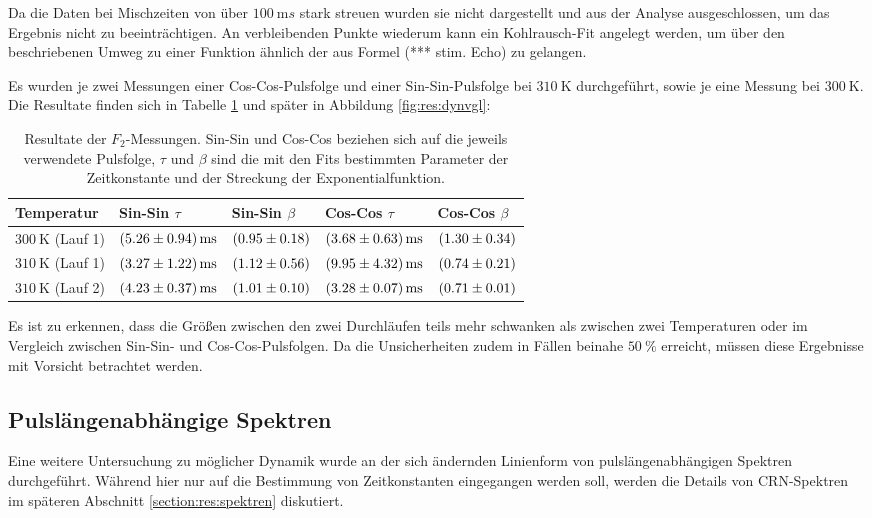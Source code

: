Da die Daten bei Mischzeiten von über $\SI{100}{\milli s}$ stark streuen wurden sie nicht dargestellt und aus der Analyse ausgeschlossen, um das Ergebnis nicht zu beeinträchtigen. An verbleibenden Punkte wiederum kann ein Kohlrausch-Fit angelegt werden, um über den beschriebenen Umweg zu einer Funktion ähnlich der aus Formel (*** stim. Echo) zu gelangen.

Es wurden je zwei Messungen einer Cos-Cos-Pulsfolge und einer Sin-Sin-Pulsfolge bei $\SI{310}{\kelvin}$ durchgeführt, sowie je eine Messung bei $\SI{300}{\kelvin}$. Die Resultate finden sich in Tabelle \ref{tab:res:F_2} und später in Abbildung \ref{fig:res:dynvgl}:
\begin{table}
	\centering
	\begin{tabular}{lllll}
		\hline
		Temperatur & Sin-Sin $\tau$ & Sin-Sin $\beta$ & Cos-Cos $\tau$ & Cos-Cos $\beta$ \\ \hline
		$\SI{300}{\kelvin}$ (Lauf 1) & $\SI{5.26 (94)}{\milli s}$ & $\SI{0.95 (18)}{}$ & $\SI{3.68 (63)}{\milli s}$ & $\SI{1.30 (34)}{}$ \\
		$\SI{310}{\kelvin}$ (Lauf 1) & $\SI{3.27 (122)}{\milli s}$ & $\SI{1.12 (56)}{}$ & $\SI{9.95 (432)}{\milli s}$ & $\SI{0.74 (21)}{}$ \\
		$\SI{310}{\kelvin}$ (Lauf 2) & $\SI{4.23 (37)}{\milli s}$ & $\SI{1.01 (10)}{}$ & $\SI{3.28 (7)}{\milli s}$ & $\SI{0.71 (1)}{}$ \\
		 \hline
	\end{tabular}
	\caption{Resultate der $F_2$-Messungen. Sin-Sin und Cos-Cos beziehen sich auf die jeweils verwendete Pulsfolge, $\tau$ und $\beta$ sind die mit den Fits bestimmten Parameter der Zeitkonstante und der Streckung der Exponentialfunktion. \label{tab:res:F_2}}
\end{table}

Es ist zu erkennen, dass die Größen zwischen den zwei Durchläufen teils mehr schwanken als zwischen zwei Temperaturen oder im Vergleich zwischen Sin-Sin- und Cos-Cos-Pulsfolgen. Da die Unsicherheiten zudem in Fällen beinahe $\SI{50}{\percent}$ erreicht, müssen diese Ergebnisse mit Vorsicht betrachtet werden.



\subsection{Pulslängenabhängige Spektren} \label{section:res:spekdyn}

Eine weitere Untersuchung zu möglicher Dynamik wurde an der sich ändernden Linienform von pulslängenabhängigen Spektren durchgeführt. Während hier nur auf die Bestimmung von Zeitkonstanten eingegangen werden soll, werden die Details von CRN-Spektren im späteren Abschnitt \ref{section:res:spektren} diskutiert.


